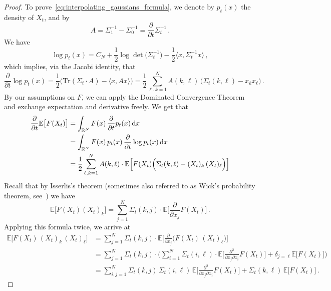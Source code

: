 \documentclass[11pt]{article}
\theoremstyle{definition}
\theoremstyle{remark}
\numberwithin{theorem}{section}
\newcommand{\bR}{\mathbb R}
\newcommand{\bE}{\mathbb E}
\begin{document}
\begin{proof}
        To prove~\eqref{eq:interpolating_gaussians_formula}, we denote by $p_t(x)$ the density of $X_t$, and by 
        \begin{equation} \label{eq:proof_of_gaussian_IBP_def_of_A}
            A = \Sigma_1^{-1} - \Sigma_0^{-1} = \frac{\partial}{\partial t} \Sigma_t^{-1} \, .
        \end{equation}
        We have
        \[
        \log p_t(x) = C_N + \frac{1}{2} \log \det\big( \Sigma_t^{-1}\big) - \frac{1}{2} \langle x,\Sigma_t^{-1}x \rangle \, , 
        \]
        which implies, via the Jacobi identity, that
        \[
        \frac{\partial}{ \partial t} \log p_t(x) = \frac{1}{2} \Big( \text{Tr}(\Sigma_t \cdot A) - \langle x, A x \rangle   \Big) = \frac{1}{2} \sum_{\ell,k=1}^{N} A (k,\ell) \, \Big( \Sigma_t (k,\ell) - x_k x_\ell  \Big) \, .
        \]
        By our assumptions on $F$, we can apply the Dominated Convergence Theorem and exchange expectation and derivative freely. We get that 
        \begin{align} \label{eq:proof_of_lemma:gaussian_integration_by_parts_after_derivative_of_density} \nonumber 
             \frac{\partial}{ \partial t} \bE\big[F(X_t) \big] &= \int_{\bR^N} F(x) \, \frac{\partial}{ \partial t} p_t(x) \, {\rm d} x \\ \nonumber  &= \int_{\bR^N} F(x) \, p_t(x) \, \frac{\partial}{ \partial t} \log p_t(x) \, {\rm d} x \\ &= \frac{1}{2} \sum_{\ell,k=1}^{N} A(k,\ell ) \cdot \bE\Big[F(X_t) \Big( \Sigma_t (k,\ell) - (X_t)_k \,  (X_t)_\ell  \Big) \Big]
        \end{align}
        Recall that by Isserlis's theorem (sometimes also referred to as Wick's probability theorem, see~\cite[Chapter~1]{Janson-book}) we have
        \begin{equation*}
            \bE\big[F(X_t) (X_t)_k \big] = \sum_{j=1}^{N} \Sigma_t(k,j) \cdot \bE\Big[\frac{\partial}{\partial x_j} F(X_t)\Big] \, .
        \end{equation*}
        Applying this formula twice, we arrive at
        \begin{align*}
            \bE\Big[F(X_t) \, (X_t)_k \,  (X_t)_\ell  \Big] &= \sum_{j=1}^{N} \Sigma_t(k,j) \cdot \bE\Big[\frac{\partial}{\partial x_j} \Big( F(X_t) \,  (X_t)_\ell \Big) \Big] \\ &= \sum_{j=1}^{N} \Sigma_t(k,j) \cdot \Big( \sum_{i=1}^{N} \Sigma_t(i,\ell) \cdot  \bE\Big[\frac{\partial^2}{\partial x_j \partial x_i}  F(X_t)  \Big] + \delta_{j=\ell} \bE\big[F(X_t)\big]  \Big)  \\ &= \sum_{i,j=1}^{N} \Sigma_t(k,j) \, \Sigma_t(i,\ell) \, \bE\Big[\frac{\partial^2}{\partial x_j \partial x_i}  F(X_t)  \Big] + \Sigma_t(k,\ell)\,  \bE\big[F(X_t)\big] \, .

\end{align*}
\end{proof}
\end{document}
